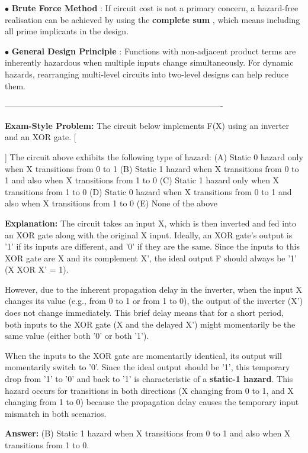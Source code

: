\documentclass{article}
\begin{document}
$\bullet$ \textbf{Brute Force Method} : If circuit cost is not a primary concern, a hazard-free realisation can be achieved by using the \textbf{complete sum} , which means including all prime implicants in the design.

$\bullet$ \textbf{General Design Principle} : Functions with non-adjacent product terms are inherently hazardous when multiple inputs change simultaneously. For dynamic hazards, rearranging multi-level circuits into two-level designs can help reduce them.

\-------------------------------------------------------------------------------- 

\textbf{Exam-Style Problem:} The circuit below implements F(X) using an inverter and an XOR gate. [ \begin{center}  \end{center} ] The circuit above exhibits the following type of hazard: (A) Static 0 hazard only when X transitions from 0 to 1 (B) Static 1 hazard when X transitions from 0 to 1 and also when X transitions from 1 to 0 (C) Static 1 hazard only when X transitions from 1 to 0 (D) Static 0 hazard when X transitions from 0 to 1 and also when X transitions from 1 to 0 (E) None of the above

\textbf{Explanation:} The circuit takes an input X, which is then inverted and fed into an XOR gate along with the original X input. Ideally, an XOR gate's output is '1' if its inputs are different, and '0' if they are the same. Since the inputs to this XOR gate are X and its complement X', the ideal output F should always be '1' (X XOR X' = 1).

However, due to the inherent propagation delay in the inverter, when the input X changes its value (e.g., from 0 to 1 or from 1 to 0), the output of the inverter (X') does not change immediately. This brief delay means that for a short period, both inputs to the XOR gate (X and the delayed X') might momentarily be the same value (either both '0' or both '1').

When the inputs to the XOR gate are momentarily identical, its output will momentarily switch to '0'. Since the ideal output should be '1', this temporary drop from '1' to '0' and back to '1' is characteristic of a \textbf{static-1 hazard}. This hazard occurs for transitions in both directions (X changing from 0 to 1, and X changing from 1 to 0) because the propagation delay causes the temporary input mismatch in both scenarios.

\textbf{Answer:} (B) Static 1 hazard when X transitions from 0 to 1 and also when X transitions from 1 to 0.
\end{document}
